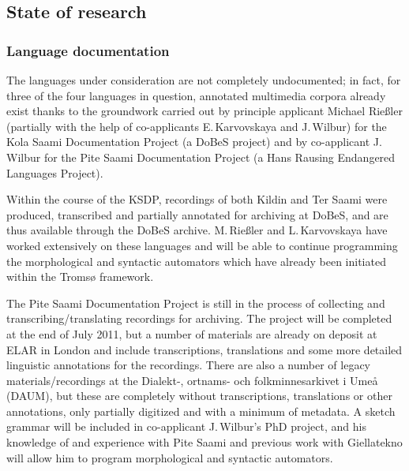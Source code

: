 \documentclass[a4paper,12pt]{article}
\begin{document}
\subsection{State of research}%
\subsubsection{Language documentation}
The languages under consideration are not completely undocumented; in fact, for three of the four languages in question, annotated multimedia corpora already exist thanks to the groundwork carried out by principle applicant Michael Rießler (partially with the help of co-applicants E.\,Karvovskaya and J.\,Wilbur) for the Kola Saami Documentation Project (a DoBeS project) and by co-applicant J.\,Wilbur for the Pite Saami Documentation Project (a Hans Rausing Endangered Languages Project). %

Within the course of the KSDP, recordings of both Kildin and Ter Saami were produced, transcribed and partially annotated for archiving at DoBeS, and are thus available through the DoBeS archive. %
M.\,Rießler and L.\,Karvovskaya have worked extensively on these languages and will be able to continue programming the morphological and syntactic automators which have already been initiated within the Tromsø framework.

The Pite Saami Documentation Project is still in the process of collecting and transcribing/translating recordings for archiving. The project will be completed at the end of July 2011, but a number of materials are already on deposit at ELAR in London and include transcriptions, translations and some more detailed linguistic annotations for the recordings. There are also a number of legacy materials/recordings at the Dialekt-, ortnams- och folkminnesarkivet i Umeå (DAUM), but these are completely without transcriptions, translations or other annotations, only partially digitized and with a minimum of metadata. A sketch grammar will be included in co-applicant J.\,Wilbur's PhD project, and his knowledge of and experience with Pite Saami and previous work with Giellatekno will allow him to program morphological and syntactic automators.
\end{document}
